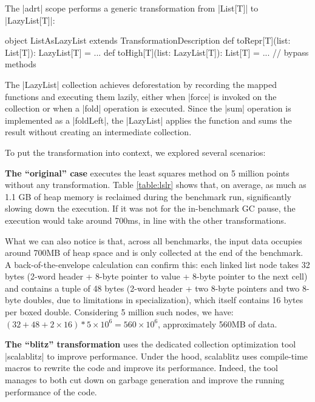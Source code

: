 \noindent
The |adrt| scope performs a generic transformation from |List[T]| to |LazyList[T]|:

\begin{lstlisting-nobreak}
object ListAsLazyList extends TransformationDescription {
  def toRepr[T](list: List[T]): LazyList[T] = ...
  def toHigh[T](list: LazyList[T]): List[T] = ...
  // bypass methods
}
\end{lstlisting-nobreak}

The |LazyList| collection achieves deforestation by recording the mapped functions and executing them lazily, either when |force| is invoked on the collection or when a |fold| operation is executed. Since the |sum| operation is implemented as a |foldLeft|, the |LazyList| applies the function and sums the result without creating an intermediate collection.

To put the transformation into context, we explored several scenarios:

\vspace{0.5em}
\noindent
\textbf{The ``original'' case} executes the least squares method on 5 million points without any transformation. Table \ref{table:lslr} shows that, on average, as much as 1.1 GB of heap memory is reclaimed during the benchmark run, significantly slowing down the execution. If it was not for the in-benchmark GC pause, the execution would take around 700ms, in line with the other transformations.

\noindent
What we can also notice is that, across all benchmarks, the input data occupies around 700MB of heap space and is only collected at the end of the benchmark. A back-of-the-envelope calculation can confirm this: each linked list node takes 32 bytes (2-word header + 8-byte pointer to value + 8-byte pointer to the next cell) and contains a tuple of 48 bytes (2-word header + two 8-byte pointers and two 8-byte doubles, due to limitations in specialization), which itself contains 16 bytes per boxed double. Considering 5 million such nodes, we have: $(32 + 48 + 2 \times 16) * 5 \times 10^6 = 560 \times 10^6$, approximately 560MB of data.

\vspace{0.5em}
\noindent
\textbf{The ``blitz'' transformation} uses the dedicated collection optimization tool |scalablitz| \cite{scalablitz, scalablitz-paper} to improve performance. Under the hood, scalablitz uses compile-time macros to rewrite the code and improve its performance. Indeed, the tool manages to both cut down on garbage generation and improve the running performance of the code.

